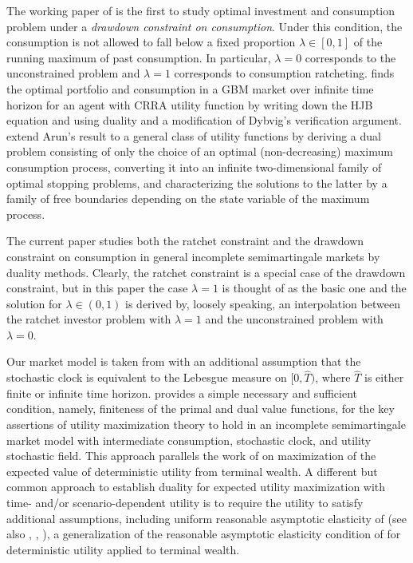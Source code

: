 \documentclass[11pt, oneside]{article}   	%
\theoremstyle{plain}
\theoremstyle{definition}
\theoremstyle{remark}
\begin{document}
The working paper of \cite{Arun2012} is the first to study optimal investment and consumption problem under a \textit{drawdown constraint on consumption}. Under this condition, the consumption is not allowed to fall below a fixed proportion $\lambda\in[0,1]$ of the running maximum of past consumption. In particular, $\lambda=0$ corresponds to the unconstrained problem and $\lambda=1$ corresponds to consumption ratcheting. \cite{Arun2012} finds the optimal portfolio and consumption in a GBM market over infinite time horizon for an agent with CRRA utility function by writing down the HJB equation and using duality and a modification of Dybvig's verification argument. \cite{Jeon:2021aa} extend Arun's result to a general class of utility functions by deriving a dual problem consisting of only the choice of an optimal (non-decreasing) maximum consumption process, converting it into an infinite two-dimensional family of optimal stopping problems, and characterizing the solutions to the latter by a family of free boundaries depending on the state variable of the maximum process.

The current paper studies both the ratchet constraint and the drawdown constraint on consumption in general incomplete semimartingale markets by duality methods. Clearly, the ratchet constraint is a special case of the drawdown constraint, but in this paper the case $\lambda=1$ is thought of as the basic one and the solution for $\lambda\in(0,1)$ is derived by, loosely speaking, an interpolation between the ratchet investor problem with $\lambda=1$ and the unconstrained problem with $\lambda=0$.

Our market model is taken from \cite{mostovyi} with an additional assumption that the stochastic clock is equivalent to the Lebesgue measure on $[0,\hat{T})$, where $\hat{T}$ is either finite or infinite time horizon. \cite{mostovyi} provides a simple necessary and sufficient condition, namely, finiteness of the primal and dual value functions, for the key assertions of utility maximization theory to hold in an incomplete semimartingale market model with intermediate consumption, stochastic clock, and utility stochastic field. This approach parallels the work of \cite{Kramkov:2003aa} on maximization of the expected value of deterministic utility from terminal wealth. A different but common approach to establish duality for expected utility maximization with time- and/or scenario-dependent utility is to require the utility to satisfy additional assumptions, including uniform reasonable asymptotic elasticity of \cite{Karatzas-Zitkovic2003} (see also \cite{Zitkovic2005}, \cite{BK}, \cite{yu}), a generalization of the reasonable asymptotic elasticity condition of \cite{Kramkov:1999aa} for deterministic utility applied to terminal wealth.
\end{document}
